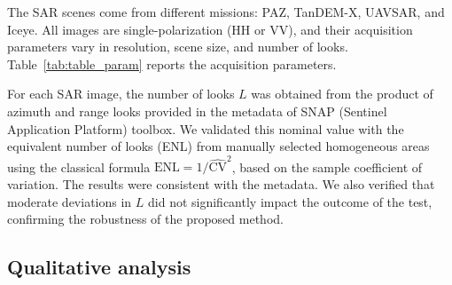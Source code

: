 \documentclass[
  lettersize  journal,
]{IEEEtran}%
\begin{document}
The SAR scenes come from different missions: PAZ, TanDEM-X, UAVSAR, and
Iceye. All images are single-polarization (HH or VV), and their
acquisition parameters vary in resolution, scene size, and number of
looks. Table~\ref{tab:table_param} reports the acquisition parameters.

\renewcommand{\arraystretch}{2.5}

\begin{table}[hbt]
\centering\centering
\caption{\label{tab:table_param}Parameters of selected SAR images}
\centering
{}
\end{table}

For each SAR image, the number of looks \(L\) was obtained from the
product of azimuth and range looks provided in the metadata of SNAP
(Sentinel Application Platform) toolbox. We validated this nominal value
with the equivalent number of looks (ENL) from manually selected
homogeneous areas using the classical formula
\(\text{ENL} = 1/\widehat{\text{CV}}^2\), based on the sample
coefficient of variation. The results were consistent with the metadata.
We also verified that moderate deviations in \(L\) did not significantly
impact the outcome of the test, confirming the robustness of the
proposed method.

\subsection{Qualitative analysis}\label{qualitative-analysis}
\end{document}
